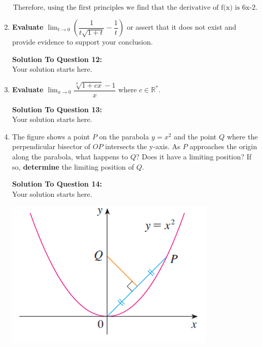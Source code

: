 \documentclass[12pt]{book}
\begin{document}
\begin{enumerate}
$$\boxed{\text{Therefore, using the first principles we find that the derivative of f(x) is 6x-2.}}$$

\vspace{0.3cm}


\newpage


\item \textbf{Evaluate} $\lim_{t\to 0}\limits \left(\dfrac{1}{t\sqrt{1+t}} - \dfrac{1}{t}\right)$ or assert that it does not exist and provide evidence to support your conclusion.

\vspace{0.3cm} 
\textbf{Solution To Question 12:}\\
 Your solution starts here.
\vspace{0.3cm}

\newpage

\item \textbf{Evaluate} $\lim_{x\to 0}\limits \dfrac{\sqrt[3]{1+cx}-1}{x}$ where $c \in \mathbb{R^*}$.

\vspace{0.3cm} 
\textbf{Solution To Question 13:}\\
 Your solution starts here.
\vspace{0.3cm}

\newpage


\item The figure shows a point $P$ on the parabola $y=x^2$ and the point $Q$ where the perpendicular bisector of $OP$ intersects the y-axis. As $P$ approaches the origin along the parabola, what happens to $Q$? Does it have a limiting position? If so, \textbf{determine} the limiting position of $Q$. 

\vspace{0.3cm} 
\textbf{Solution To Question 14:}\\
 Your solution starts here.
\vspace{0.3cm}


\newpage
\vspace{4cm}
\includegraphics[width=\linewidth]{parabola.png}


\newpage



\end{enumerate}
\end{document}
